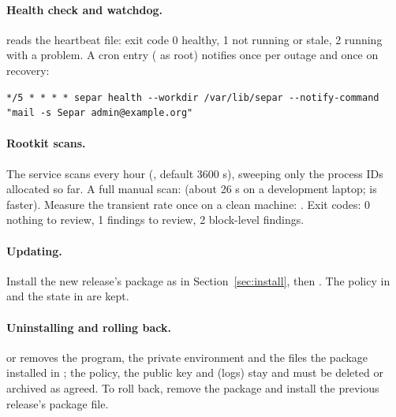\documentclass[11pt,a4paper]{article}
\begin{document}
\paragraph{Health check and watchdog.}  reads the heartbeat file: exit code 0
healthy, 1 not running or stale, 2 running with a problem. A cron entry ( as root)
notifies once per outage and once on recovery:
\begin{lstlisting}
*/5 * * * * separ health --workdir /var/lib/separ --notify-command "mail -s Separ admin@example.org"
\end{lstlisting}

\paragraph{Rootkit scans.} The service scans every hour (, default 3600 s),
sweeping only the process IDs allocated so far. A full manual scan:
 (about 26 s on a development laptop;  is
faster). Measure the transient rate once on a clean machine:
. Exit codes: 0 nothing to
review, 1 findings to review, 2 block-level findings.

\paragraph{Updating.} Install the new release's package as in Section~\ref{sec:install}, then
. The policy in  and the state in
 are kept.

\paragraph{Uninstalling and rolling back.}  or  removes the program, the private environment and the files the package installed in
; the policy, the public key and  (logs) stay and must be
deleted or archived as agreed. To roll back, remove the package and install the previous release's
package file.
\end{document}
